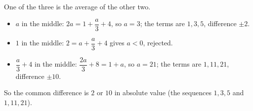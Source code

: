 One of the three is the average of the other two.
\begin{itemize}
\item $a$ in the middle: $2a=1+\dfrac a3+4$, so $a=3$; the terms are $1,3,5$, difference $\pm2$.
\item $1$ in the middle: $2=a+\dfrac a3+4$ gives $a<0$, rejected.
\item $\dfrac a3+4$ in the middle: $\dfrac{2a}3+8=1+a$, so $a=21$; the terms are $1,11,21$, difference $\pm10$.
\end{itemize}
So the common difference is $\boxed{2}$ or $\boxed{10}$ in absolute value (the sequences $1,3,5$ and $1,11,21$).

